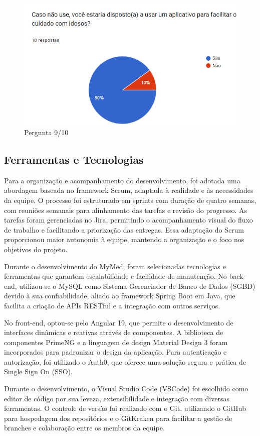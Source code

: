 \documentclass[
	article,			%
	12pt,				%
	oneside,			%
	a4paper,			%
    BIBLATEX,           %
	english,			%
	brazil,				%
	sumario=tradicional
	]{abntex2}
\newcommand\nomeprojeto{MyMed}
\begin{document}
\begin{figure}[!htbp]
    \centering
    \includegraphics[width=0.75\linewidth]{Figuras/utilizaria-app.png}
    \caption{Pergunta 9/10}
    \label{utilizaria_app}
\end{figure}

\subsection{Ferramentas e Tecnologias}

Para a organização e acompanhamento do desenvolvimento, foi adotada uma abordagem baseada no framework Scrum, adaptada à realidade e às necessidades da equipe. O processo foi estruturado em sprints com duração de quatro semanas, com reuniões semanais para alinhamento das tarefas e revisão do progresso. As tarefas foram gerenciadas no Jira, permitindo o acompanhamento visual do fluxo de trabalho e facilitando a priorização das entregas. Essa adaptação do Scrum proporcionou maior autonomia à equipe, mantendo a organização e o foco nos objetivos do projeto.

Durante o desenvolvimento do \nomeprojeto, foram selecionadas tecnologias e ferramentas que garantem escalabilidade e facilidade de manutenção. No back-end, utilizou-se o MySQL como Sistema Gerenciador de Banco de Dados (SGBD) devido à sua confiabilidade, aliado ao framework Spring Boot em Java, que facilita a criação de APIs RESTful e a integração com outros serviços.

No front-end, optou-se pelo Angular 19, que permite o desenvolvimento de interfaces dinâmicas e reativas através de componentes. A biblioteca de componentes PrimeNG e a linguagem de design Material Design 3 foram incorporados para padronizar o design da aplicação. Para autenticação e autorização, foi utilizado o Auth0, que oferece uma solução segura e prática de Single Sign On (SSO).

Durante o desenvolvimento, o Visual Studio Code (VSCode) foi escolhido como editor de código por sua leveza, extensibilidade e integração com diversas ferramentas. O controle de versão foi realizado com o Git, utilizando o GitHub para hospedagem dos repositórios e o GitKraken para facilitar a gestão de branches e colaboração entre os membros da equipe.
\end{document}
